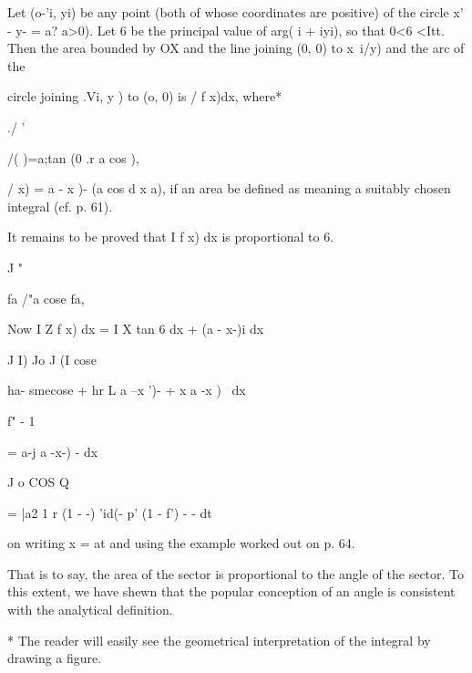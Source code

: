 %
%

Let (o-'i, yi) be any point (both of whose coordinates are positive)
of the circle x' - y- = a? a>0). Let 6 be the principal value of arg(
i + iyi), so that 0<6 <Itt. Then the area bounded by OX and the line
joining (0, 0) to x\, i/y) and the arc of the

circle joining .Vi, y ) to (o, 0) is / f x)dx, where*

./ '

/( )=a;tan (0 .r a cos ),

/ x) = a - x )- (a cos d x a), if an area be defined as meaning a
suitably chosen integral (cf. p. 61).

It remains to be proved that I f x) dx is proportional to 6.

J "

fa /"a cose fa,

Now I Z f x) dx = I X tan 6 dx + (a - x-)i dx

J I) Jo J (I cose

 ha- smecose + hr L a --x ')- + x a -x ) \ dx

f" - 1

= a-j a -x-) - dx

J o COS Q

= |a2 1 r (1 - -) 'id(- p' (1 - f') - - dt\

on writing x = at and using the example worked out on p. 64.

That is to say, the area of the sector is proportional to the angle of
the sector. To this extent, we have shewn that the popular conception
of an angle is consistent with the analytical definition.

* The reader will easily see the geometrical interpretation of the
integral by drawing a figure.